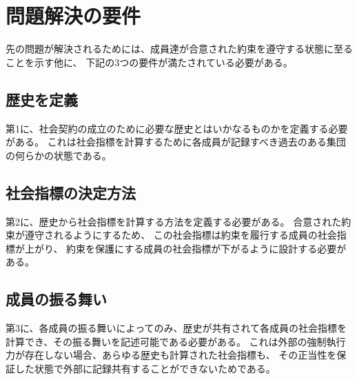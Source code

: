 \section{問題解決の要件}
先の問題が解決されるためには、成員達が合意された約束を遵守する状態に至ることを示す他に、
下記の3つの要件が満たされている必要がある。

\subsection{歴史を定義}
第1に、社会契約の成立のために必要な歴史とはいかなるものかを定義する必要がある。
これは社会指標を計算するために各成員が記録すべき過去のある集団の何らかの状態である。

\subsection{社会指標の決定方法}
第2に、歴史から社会指標を計算する方法を定義する必要がある。
合意された約束が遵守されるようにするため、
この社会指標は約束を履行する成員の社会指標が上がり、
約束を保護にする成員の社会指標が下がるように設計する必要がある。

\subsection{成員の振る舞い}
第3に、各成員の振る舞いによってのみ、歴史が共有されて各成員の社会指標を計算でき、その振る舞いを記述可能である必要がある。
これは外部の強制執行力が存在しない場合、あらゆる歴史も計算された社会指標も、
その正当性を保証した状態で外部に記録共有することができないためである。